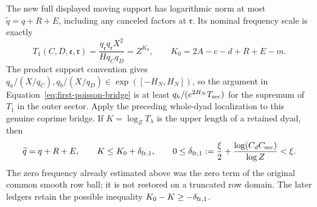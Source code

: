 \documentclass[11pt,a4paper]{article}
\numberwithin{equation}{section}
\numberwithin{figure}{section}
\theoremstyle{definition}
\theoremstyle{remark}
\begin{document}
The new full displayed moving support has logarithmic norm at most
\(\widetilde q=q+R+E\), including any canceled factors at
\(\mathfrak r\).  Its nominal frequency scale is exactly
\[
 T_1(C,D,\mathfrak e,\mathfrak r)
 =\frac{q_{\mathfrak e}q_{\mathfrak r}X^2}
        {Hq_Cq_D}=Z^{K_0},
 \qquad K_0=2A-c-d+R+E-m.
\]
The product support convention gives
\(q_a/(X/q_C),q_b/(X/q_D)\in\exp([-H_N,H_N])\), so the
argument in Equation~\eqref{eq:first-poisson-bridge} is at least
\(q_h/(e^{2H_N}T_{\rm sec})\) for the supremum of \(T_1\)
in the outer sector.  Apply the preceding whole-dyad localization
to this genuine coprime bridge.  If \(K=\log_ZT_\lambda\) is
the upper length of a retained dyad, then
\begin{equation}
 \widetilde q=q+R+E,\qquad
 K\le K_0+\delta_{{\rm fr},1},\qquad
 0\le\delta_{{\rm fr},1}:=\frac\xi2+
       \frac{\log(C_dC_{\rm sec})}{\log Z}<\xi.
 \label{old-eq:2.3}
\end{equation}
The zero frequency already estimated above was the zero term of the
original common smooth row ball; it is not restored on a truncated
row domain.  The later ledgers retain the possible inequality
\(K_0-K\ge-\delta_{{\rm fr},1}\).
\end{document}
